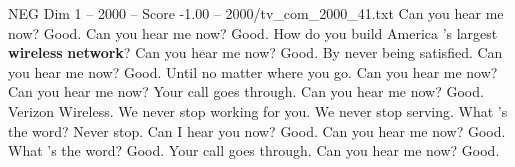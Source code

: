 \begin{textsample}{NEG Dim 1 – 2000 – Score -1.00 – 2000/tv\_com\_2000\_41.txt}  \label{ex:f1_neg_030}
Can you hear me now?
Good.
Can you hear me now?
Good.
How do you build America 's largest \textbf{wireless} \textbf{network}?
Can you hear me now?
Good.
By never being satisfied.
Can you hear me now?
Good.
Until no matter where you go.
Can you hear me now?
Can you hear me now?
Your call goes through.
Can you hear me now?
Good.
Verizon Wireless.
We never stop working for you.
We never stop serving.
What 's the word?
Never stop.
Can I hear you now?
Good.
Can you hear me now?
Good.
What 's the word?
Good.
Your call goes through.
Can you hear me now?
Good.

\end{textsample}
